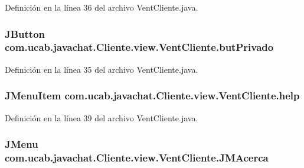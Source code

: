 Definición en la línea 36 del archivo Vent\-Cliente.\-java.

\hypertarget{classcom_1_1ucab_1_1javachat_1_1_cliente_1_1view_1_1_vent_cliente_a485c7cc6a21b05d2e515dab3077da86f}{
\subsubsection[{but\-Privado}]{\setlength{\rightskip}{0pt plus 5cm}J\-Button com.\-ucab.\-javachat.\-Cliente.\-view.\-Vent\-Cliente.\-but\-Privado}}\label{classcom_1_1ucab_1_1javachat_1_1_cliente_1_1view_1_1_vent_cliente_a485c7cc6a21b05d2e515dab3077da86f}


Definición en la línea 35 del archivo Vent\-Cliente.\-java.

\hypertarget{classcom_1_1ucab_1_1javachat_1_1_cliente_1_1view_1_1_vent_cliente_a11f89017d035722b0043be1852e06ace}{
\subsubsection[{help}]{\setlength{\rightskip}{0pt plus 5cm}J\-Menu\-Item com.\-ucab.\-javachat.\-Cliente.\-view.\-Vent\-Cliente.\-help}}\label{classcom_1_1ucab_1_1javachat_1_1_cliente_1_1view_1_1_vent_cliente_a11f89017d035722b0043be1852e06ace}


Definición en la línea 39 del archivo Vent\-Cliente.\-java.

\hypertarget{classcom_1_1ucab_1_1javachat_1_1_cliente_1_1view_1_1_vent_cliente_ad30b231b7819130f9ef8749da385cbc2}{
\subsubsection[{J\-M\-Acerca}]{\setlength{\rightskip}{0pt plus 5cm}J\-Menu com.\-ucab.\-javachat.\-Cliente.\-view.\-Vent\-Cliente.\-J\-M\-Acerca}}\label{classcom_1_1ucab_1_1javachat_1_1_cliente_1_1view_1_1_vent_cliente_ad30b231b7819130f9ef8749da385cbc2}


